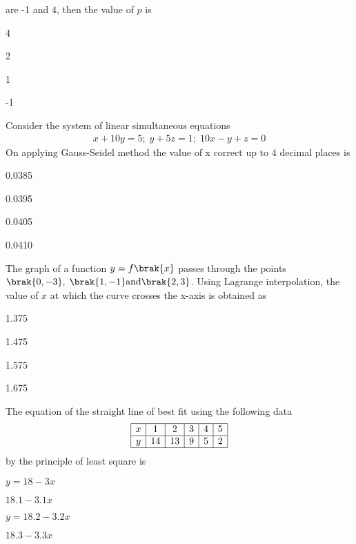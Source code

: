 are -1 and 4, then the value of $p$ is
\begin{enumerate}
    \begin{multicols}{4}
        \item 4
        \item 2
        \item 1
        \item -1
    \end{multicols}
\end{enumerate}
\bigskip
\item Consider the system of linear simultaneous equations
\begin{align*}
    x+10y=5;\;y+5z=1;\;10x-y+z=0
\end{align*}
On applying Gauss-Seidel method the value of x correct up to 4 decimal places is
\begin{enumerate}
    \begin{multicols}{4}
        \item 0.0385
        \item 0.0395
        \item 0.0405
        \item 0.0410
    \end{multicols}
\end{enumerate}
\bigskip
\item The graph of a function $y=f\brak{x}$ passes through the points $\brak{0,-3},\;\brak{1,-1}\text{and} \brak{2,3}$. Using Lagrange interpolation, the value of $x$ at which the curve crosses the x-axis is obtained as
\begin{enumerate}
    \begin{multicols}{4}
        \item 1.375
        \item 1.475
        \item 1.575
        \item 1.675
    \end{multicols}
\end{enumerate}
\bigskip
\item The equation of the straight line of best fit using the following data
\[
\begin{array}{|c|c|c|c|c|c|}
\hline
x & 1 & 2 & 3 & 4 & 5 \\
\hline
y & 14 & 13 & 9 & 5 & 2 \\
\hline
\end{array}
\]
by the principle of least square is
\begin{enumerate}
    \begin{multicols}{2}
        \item $y=18-3x$
        \columnbreak
        \item $18.1-3.1x$
        \end{multicols}
        \begin{multicols}{2}
        \item $y=18.2-3.2x$
        \item $18.3-3.3x$
    \end{multicols}
\end{enumerate}
